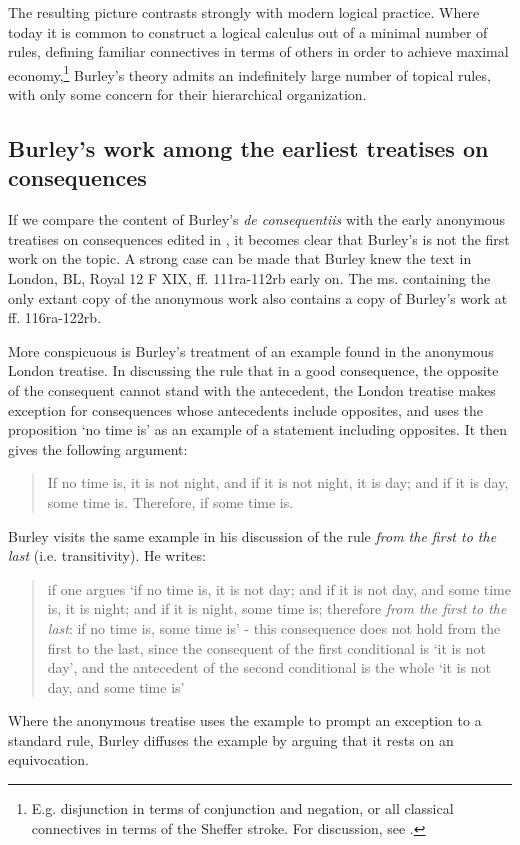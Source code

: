 \documentclass[]{article}
\begin{document}
The resulting picture contrasts strongly with modern logical practice. Where today it is common to construct a logical calculus out of a minimal number of rules, defining familiar connectives in terms of others in order to achieve maximal economy,\footnote{E.g. disjunction in terms of conjunction and negation, or all classical connectives in terms of the Sheffer stroke. For discussion, see \cite{Paseau2016}.} Burley's theory admits an indefinitely large number of topical rules, with only some concern for their hierarchical organization.

\subsection{Burley's work among the earliest treatises on consequences}
If we compare the content of Burley's \textit{de consequentiis} with the early anonymous treatises on consequences edited in \cite{Green-Pedersen1980a}, it becomes clear that Burley's is not the first work on the topic. A strong case can be made that Burley knew the text in London, BL, Royal 12 F XIX, ff. 111ra-112rb early on. The ms. containing the only extant copy of the anonymous work also contains a copy of Burley's work at ff. 116ra-122rb. 

More conspicuous is Burley's treatment of an example found in the anonymous London treatise. In discussing the rule that in a good consequence, the opposite of the consequent cannot stand with the antecedent, the London treatise makes exception for consequences whose antecedents include opposites, and uses the proposition `no time is' as an example of a statement including opposites. It then gives the following argument:
\begin{quote}
	If no time is, it is not night, and if it is not night, it is day; and if it is day, some time is. Therefore, if some time is. \cite[p. 7, par. 18]{Green-Pedersen1980a}
\end{quote}
Burley visits the same example in his discussion of the rule \textit{from the first to the last} (i.e. transitivity). He writes: 
\begin{quote}
	if one argues `if no time is, it is not day; and if it is not day, and some time is, it is night; and if it is night, some time is; therefore \textit{from the first to the last}: if no time is, some time is' - this consequence does not hold from the first to the last, since the consequent of the first conditional is `it is not day', and the antecedent of the second conditional is the whole `it is not day, and some time is' \cite[pp. 114-115, par 8]{Green-Pedersen1980b}
\end{quote}
Where the anonymous treatise uses the example to prompt an exception to a standard rule, Burley diffuses the example by arguing that it rests on an equivocation.
\end{document}
